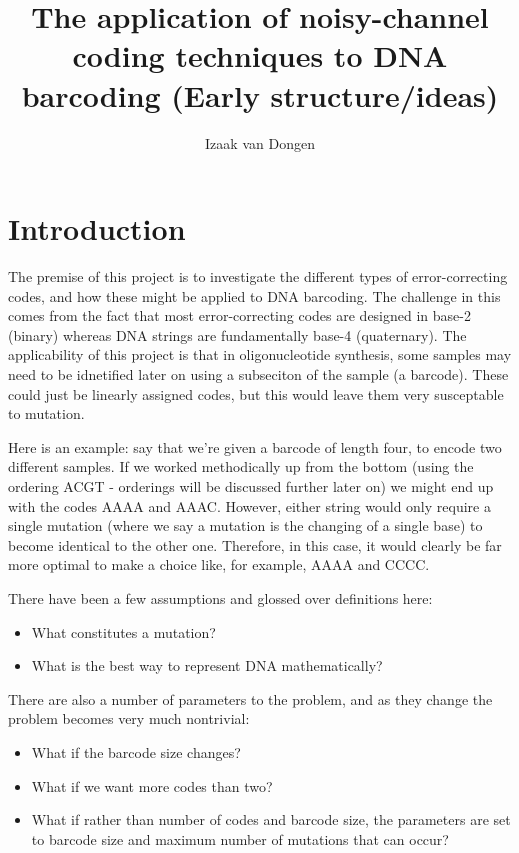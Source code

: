\documentclass{article}
\title{The application of noisy-channel coding techniques to DNA barcoding (Early structure/ideas)}
\author{Izaak van Dongen}
\begin{document}
    \maketitle
    \tableofcontents

    \section{Introduction}
    The premise of this project is to investigate the different types of
    error-correcting codes, and how these might be applied to DNA barcoding.
    The challenge in this comes from the fact that most error-correcting codes
    are designed in base-2 (binary) whereas DNA strings are fundamentally
    base-4 (quaternary). The applicability of this project is that in
    oligonucleotide synthesis, some samples may need to be idnetified later on
    using a subseciton of the sample (a barcode). These could just be linearly
    assigned codes, but this would leave them very susceptable to mutation.

    Here is an example: say that we're given a barcode of length four, to
    encode two different samples. If we worked methodically up from the bottom
    (using the ordering ACGT - orderings will be discussed further later on) we
    might end up with the codes AAAA and AAAC. However, either string would
    only require a single mutation (where we say a mutation is the changing of
    a single base) to become identical to the other one. Therefore, in this
    case, it would clearly be far more optimal to make a choice like, for
    example, AAAA and CCCC.

    There have been a few assumptions and glossed over definitions here:

    \begin{itemize}
        \item What constitutes a mutation?
        \item What is the best way to represent DNA mathematically?
    \end{itemize}

    There are also a number of parameters to the problem, and as they change
    the problem becomes very much nontrivial:

    \begin{itemize}
    \item What if the barcode size changes?
    \item What if we want more codes than two?
    \item What if rather than number of codes and barcode size, the parameters
          are set to barcode size and maximum number of mutations that can
          occur?
    \end{itemize}
    
\end{document}
